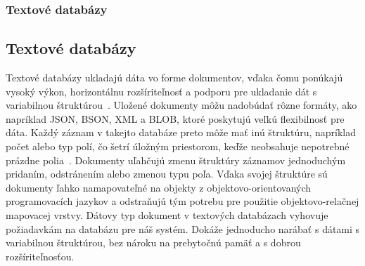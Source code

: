 %
%
{
	\subsubsection{Textové databázy}
}
{
	\subsection{Textové databázy}
}
\label{subsubsection:text_dbs}
Textové databázy ukladajú dáta vo forme dokumentov, vďaka čomu ponúkajú vysoký výkon, horizontálnu rozšíriteľnosť a podporu pre ukladanie dát s variabilnou štruktúrou~\cite{NoSQLDBvsRealtionDB}. Uložené dokumenty môžu nadobúdať rôzne formáty, ako napríklad JSON, BSON, XML a BLOB, ktoré poskytujú veľkú flexibilnosť pre dáta. Každý záznam v takejto databáze preto môže mať inú štruktúru, napríklad počet alebo typ polí, čo šetrí úložným priestorom, keďže neobsahuje nepotrebné prázdne polia~\cite{NoSQLDBvsRealtionDB}.
Dokumenty uľahčujú zmenu štruktúry záznamov jednoduchým pridaním, odstránením alebo zmenou typu poľa. Vďaka svojej štruktúre sú dokumenty ľahko namapovateľné na objekty z objektovo-orientovaných programovacích jazykov a odstraňujú tým potrebu pre použitie objektovo-relačnej mapovacej vrstvy. Dátovy typ dokument v textových databázach vyhovuje požiadavkám na databázu pre náš systém. Dokáže jednoducho narábať s dátami s variabilnou štruktúrou, bez nároku na prebytočnú pamäť a s dobrou rozšíriteľnosťou.


